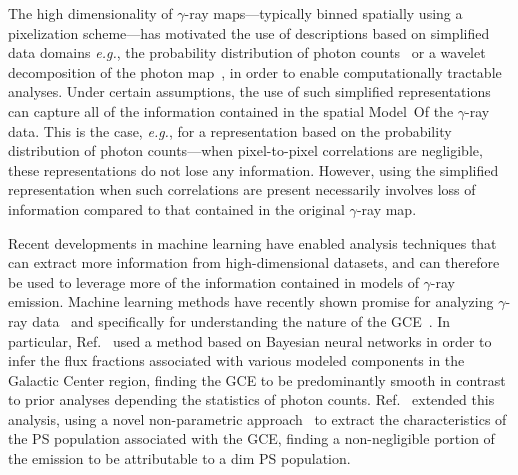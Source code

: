 \documentclass[prd,aps,10pt,nofootinbib,twocolumn,superscriptaddress,preprintnumbers,balancelastpage,longbibliography,floatfix]{revtex4-2}
\begin{document}
The high dimensionality of $\gamma$-ray maps---typically binned spatially using a pixelization scheme---has motivated the use of descriptions based on simplified data domains \emph{e.g.}, the probability distribution of photon counts~\cite{Lee:2014mza,Lee:2015fea} or a wavelet decomposition of the photon map~\cite{Bartels:2015aea,Balaji:2018rwz,McDermott:2015ydv,Zhong:2019ycb}, in order to enable computationally tractable analyses. Under certain assumptions, the use of such simplified representations can capture all of the information contained in the spatial {Model~O}f the $\gamma$-ray data. This is the case, \emph{e.g.}, for a representation based on the probability distribution of photon counts---when pixel-to-pixel correlations are negligible, these representations do not lose any information. However, using the simplified representation when such correlations are present necessarily involves loss of information compared to that contained in the original $\gamma$-ray map.

Recent developments in machine learning have enabled analysis techniques that can extract more information from high-dimensional datasets, and can therefore be used to leverage more of the information contained in models of $\gamma$-ray emission. Machine learning methods have recently shown promise for analyzing $\gamma$-ray data~\cite{Caron:2021map} and specifically for understanding the nature of the \Fermi GCE~\cite{List:2020mzd,List:2021aer,Caron:2017udl}. In particular, Ref.~\cite{List:2020mzd} used a method based on Bayesian neural networks in order to infer the flux fractions associated with various modeled components in the Galactic Center region, finding the GCE to be predominantly smooth in contrast to prior analyses depending the statistics of photon counts. Ref.~\cite{List:2021aer} extended this analysis, using a novel non-parametric approach~\cite{List2021} to extract the characteristics of the PS population associated with the GCE, finding a non-negligible portion of the emission to be attributable to a dim PS population.
\end{document}
